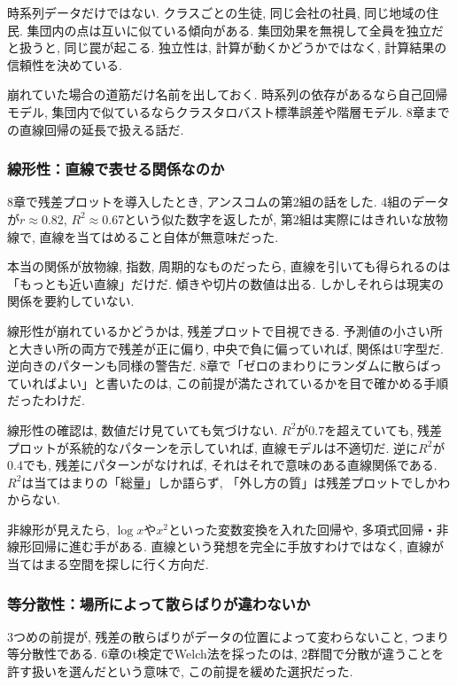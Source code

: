 時系列データだけではない. クラスごとの生徒, 同じ会社の社員, 同じ地域の住民. 集団内の点は互いに似ている傾向がある.
集団効果を無視して全員を独立だと扱うと, 同じ罠が起こる.
独立性は, 計算が動くかどうかではなく, 計算結果の信頼性を決めている.

崩れていた場合の道筋だけ名前を出しておく. 時系列の依存があるなら自己回帰モデル, 集団内で似ているならクラスタロバスト標準誤差や階層モデル. 8章までの直線回帰の延長で扱える話だ.

\subsubsection*{線形性：直線で表せる関係なのか}

8章で残差プロットを導入したとき, アンスコムの第2組の話をした.
4組のデータが$r \approx 0.82$, $R^2 \approx 0.67$という似た数字を返したが, 第2組は実際にはきれいな放物線で, 直線を当てはめること自体が無意味だった.

本当の関係が放物線, 指数, 周期的なものだったら, 直線を引いても得られるのは「もっとも近い直線」だけだ.
傾きや切片の数値は出る. しかしそれらは現実の関係を要約していない.

線形性が崩れているかどうかは, 残差プロットで目視できる.
予測値の小さい所と大きい所の両方で残差が正に偏り, 中央で負に偏っていれば, 関係はU字型だ.
逆向きのパターンも同様の警告だ.
8章で「ゼロのまわりにランダムに散らばっていればよい」と書いたのは, この前提が満たされているかを目で確かめる手順だったわけだ.

線形性の確認は, 数値だけ見ていても気づけない.
$R^2$が0.7を超えていても, 残差プロットが系統的なパターンを示していれば, 直線モデルは不適切だ.
逆に$R^2$が0.4でも, 残差にパターンがなければ, それはそれで意味のある直線関係である.
$R^2$は当てはまりの「総量」しか語らず, 「外し方の質」は残差プロットでしかわからない.

非線形が見えたら, $\log x$や$x^2$といった変数変換を入れた回帰や, 多項式回帰・非線形回帰に進む手がある. 直線という発想を完全に手放すわけではなく, 直線が当てはまる空間を探しに行く方向だ.

\subsubsection*{等分散性：場所によって散らばりが違わないか}

3つめの前提が, 残差の散らばりがデータの位置によって変わらないこと, つまり等分散性である.
6章のt検定でWelch法を採ったのは, 2群間で分散が違うことを許す扱いを選んだという意味で, この前提を緩めた選択だった.

